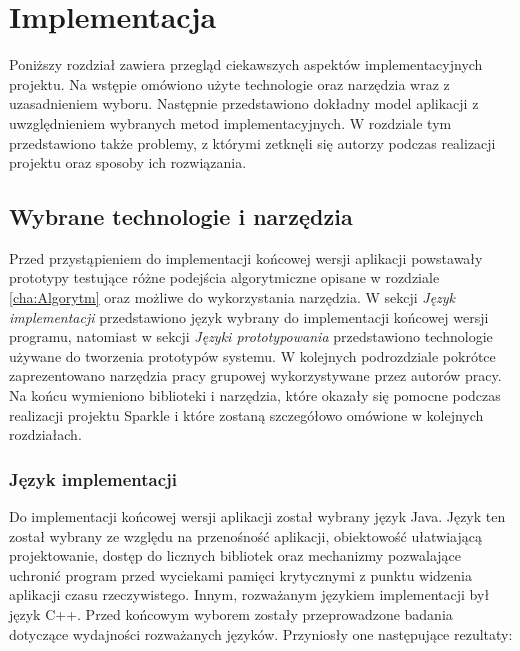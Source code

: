﻿\chapter {Implementacja}
\label{cha:implementacja}
Poniższy rozdział zawiera przegląd ciekawszych aspektów implementacyjnych projektu.
Na wstępie omówiono użyte technologie oraz narzędzia wraz z uzasadnieniem wyboru. Następnie przedstawiono dokładny model aplikacji z uwzględnieniem wybranych metod implementacyjnych. 
W rozdziale tym przedstawiono także problemy, z którymi zetknęli się autorzy podczas realizacji projektu oraz sposoby ich rozwiązania.
\section {Wybrane technologie i narzędzia}
Przed przystąpieniem do implementacji końcowej wersji aplikacji powstawały prototypy testujące różne podejścia algorytmiczne opisane w rozdziale \ref{cha:Algorytm} oraz możliwe do wykorzystania narzędzia. W sekcji \textit{Język implementacji} przedstawiono język wybrany do implementacji końcowej wersji programu, natomiast w sekcji \textit{Języki prototypowania} przedstawiono technologie używane do tworzenia prototypów systemu. 
W kolejnych podrozdziale pokrótce zaprezentowano narzędzia pracy grupowej wykorzystywane przez autorów pracy. Na końcu wymieniono biblioteki i narzędzia, które okazały się pomocne podczas realizacji projektu Sparkle i które zostaną szczegółowo omówione w kolejnych rozdziałach.
\subsection{Język implementacji}
Do implementacji końcowej wersji aplikacji został wybrany język Java.
Język ten został wybrany ze względu na przenośność aplikacji, obiektowość ułatwiającą projektowanie, dostęp do licznych 
bibliotek oraz mechanizmy pozwalające uchronić program przed wyciekami pamięci krytycznymi z punktu widzenia aplikacji czasu rzeczywistego. Innym, rozważanym językiem implementacji był język C++. Przed końcowym wyborem zostały przeprowadzone badania dotyczące wydajności rozważanych języków. Przyniosły one następujące rezultaty:
\begin{itemize}

\end{itemize}

